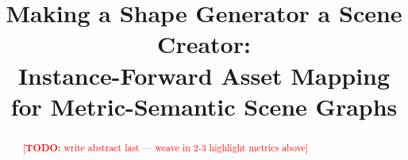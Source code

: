 \documentclass[conference]{IEEEtran}
\newcommand{\todo}[1]{\textcolor{red}{[\textbf{TODO:} #1]}}
\begin{document}
\title{Making a Shape Generator a Scene Creator:\\
Instance-Forward Asset Mapping for Metric-Semantic Scene Graphs}

\author{
}

\maketitle

\begin{abstract}
%
\todo{write abstract last — weave in 2-3 highlight metrics above}
\end{abstract}
\end{document}
